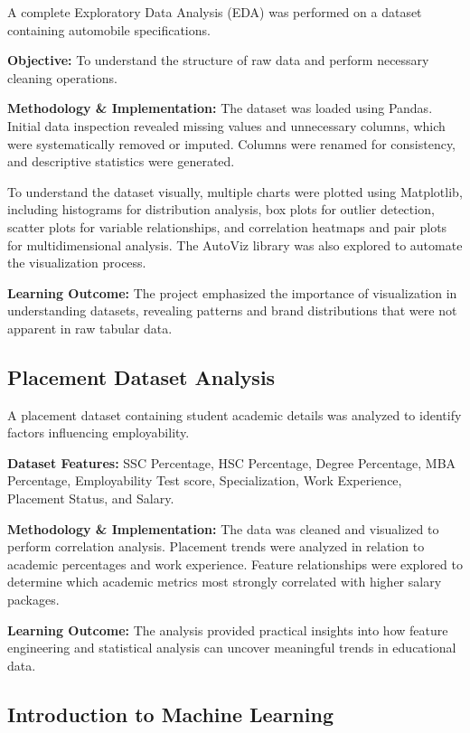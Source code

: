 A complete Exploratory Data Analysis (EDA) was performed on a dataset containing automobile specifications.

\textbf{Objective:} To understand the structure of raw data and perform necessary cleaning operations.

\textbf{Methodology \& Implementation:} 
The dataset was loaded using Pandas. Initial data inspection revealed missing values and unnecessary columns, which were systematically removed or imputed. Columns were renamed for consistency, and descriptive statistics were generated. 

To understand the dataset visually, multiple charts were plotted using Matplotlib, including histograms for distribution analysis, box plots for outlier detection, scatter plots for variable relationships, and correlation heatmaps and pair plots for multidimensional analysis. The AutoViz library was also explored to automate the visualization process.

\textbf{Learning Outcome:} The project emphasized the importance of visualization in understanding datasets, revealing patterns and brand distributions that were not apparent in raw tabular data.



\subsection{Placement Dataset Analysis}

A placement dataset containing student academic details was analyzed to identify factors influencing employability.

\textbf{Dataset Features:} SSC Percentage, HSC Percentage, Degree Percentage, MBA Percentage, Employability Test score, Specialization, Work Experience, Placement Status, and Salary.

\textbf{Methodology \& Implementation:} The data was cleaned and visualized to perform correlation analysis. Placement trends were analyzed in relation to academic percentages and work experience. Feature relationships were explored to determine which academic metrics most strongly correlated with higher salary packages.

\textbf{Learning Outcome:} The analysis provided practical insights into how feature engineering and statistical analysis can uncover meaningful trends in educational data.

\subsection{Introduction to Machine Learning}

